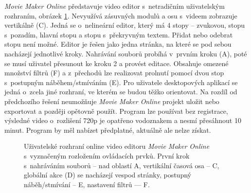 \textit{Movie Maker Online} představuje video editor s~netradičním uživatelským rozhraním, obrázek \ref{img:moviemakeronline}. Nevyužívá zásuvných modulů a osu s~videem zobrazuje vertikálně (C). Jedná se o~nelineární editor, který má 4 stopy -- zvukovou, stopu s~pozadím, hlavní stopu a stopu s~překryvným textem. Přidat nebo odebrat stopu není možné. Editor je řešen jako jedna stránka, na které se pod sebou nacházejí jednotlivé kroky. Nahrávání souborů probíhá v~prvním kroku (A), poté se musí uživatel přesunout ke kroku 2 a provést editace. Obsahuje omezené množství filtrů (F) a z~přechodů lze realizovat prolnutí pomocí dvou stop s~postupným náběhem/stmíváním (E). Pro uživatele desktopových aplikací se jedná o~zcela jiné rozhraní, ve kterém se budou těžko orientovat. Na rozdíl od předchozího řešení neumožňuje \textit{Movie Maker Online} projekt uložit nebo exportovat a později opětovně použít. Program lze používat bez registrace, výsledné video o~rozlišení 720p je opatřeno vodoznakem a nesmí přesáhnout 10 minut. Program by měl nabízet předplatné, aktuálně ale nelze získat.
\begin{figure}[h]
	\centering
	\caption{Uživatelské rozhraní online video editoru \textit{Movie Maker Online} s~vyznačeným rozložením ovládacích prvků. První krok s~nahráváním souborů -- nad oblastí A, vertikální časová osa -- C, globální akce (D) se nacházejí vespod stránky, postupný náběh/stmívání -- E, nastavení filtrů --- F.}\label{img:moviemakeronline}
\end{figure}

